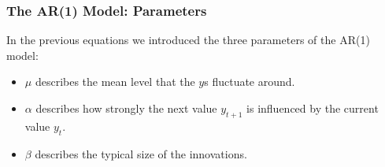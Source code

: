 \documentclass{beamer}
\begin{document}
\begin{frame}
\frametitle{The AR(1) Model: Parameters}
In the previous equations we introduced the
three parameters of the AR(1) model:\pause
\begin{itemize}
\item $\mu$ describes the mean level that the $y$s fluctuate around.\pause
\item $\alpha$ describes how strongly the next value $y_{t+1}$ is influenced
by the current value $y_t$.\pause
\item $\beta$ describes the typical size of the innovations.
\end{itemize}

\end{frame}
\end{document}
